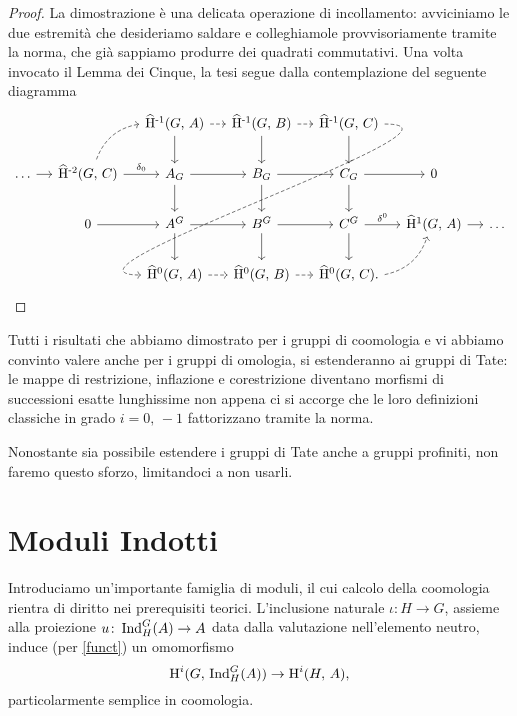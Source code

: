 \begin{proof}
	La dimostrazione è una delicata operazione di incollamento: avviciniamo le due estremità che desideriamo saldare e colleghiamole provvisoriamente tramite la norma, che già sappiamo produrre dei quadrati commutativi. Una volta invocato il Lemma dei Cinque, la tesi segue dalla contemplazione del seguente diagramma
	\[\begin{tikzcd}[column sep = small]
	&& \Hhm(G, \, A) \dar \rar[dashed]
	& \Hhm(G, \, B) \dar \rar[dashed]
	& \Hhm(G, \, C) \dar \ar[out=0, in=180, looseness=1, dashed]{dddll} %
	&& \\
	\dots \rar
	& \Hhmm(G, \, C) \rar["\delta_0"] \arrow[ur, dashed, bend left = 30]
	& A_G \rar \dar 
	& B_G \rar \arrow[d]
	& C_G \rar \dar
	& 0 & \\
	& 0 \rar
	&A^G \rar\dar
	& B^G \rar\dar
	& C^G \rar["\delta^0"]\dar
	& \Hhu(G, \, A) \rar
	& \dots \\
	&& \Hhz(G, \, A) \rar[dashed]
	& \Hhz(G, \, B)  \rar[dashed]
	& \Hhz(G, \, C). \arrow[ur, dashed, bend right = 30]
	&& \qedhere
	\end{tikzcd}\]
\end{proof}

Tutti i risultati che abbiamo dimostrato per i gruppi di coomologia e vi abbiamo convinto valere anche per i gruppi di omologia, si estenderanno ai gruppi di Tate: le mappe di restrizione, inflazione e corestrizione diventano morfismi di successioni esatte lunghissime non appena ci si accorge che le loro definizioni classiche in grado $ i = 0,\, -1 $ fattorizzano tramite la norma.\\

\begin{profinite}
	Nonostante sia possibile estendere i gruppi di Tate anche a gruppi profiniti, non faremo questo sforzo, limitandoci a non usarli.
\end{profinite}

\section{Moduli Indotti}
Introduciamo un'importante famiglia di moduli, il cui calcolo della coomologia rientra di diritto nei prerequisiti teorici. L'inclusione naturale $ \iota \colon H \to G $, assieme alla proiezione $ u \colon \operatorname{Ind}_H^G(A) \to A $ data dalla valutazione nell'elemento neutro, induce (per \ref{funct}) un omomorfismo \[ \operatorname{H}^i(G, \, \operatorname{Ind}_H^G(A)) \to \operatorname{H}^i(H, \, A), \]
particolarmente semplice in coomologia.

